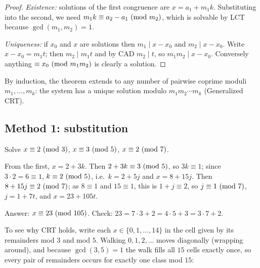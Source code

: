 \begin{proof}
\emph{Existence:} solutions of the first congruence are $x = a_1 + m_1k$. Substituting into the
second, we need $m_1 k \equiv a_2 - a_1 \ (\mathrm{mod}\ m_2)$, which is solvable by LCT because
$\gcd(m_1,m_2) = 1$.

\emph{Uniqueness:} if $x_0$ and $x$ are solutions then $m_1 \mid x - x_0$ and $m_2 \mid x - x_0$.
Write $x - x_0 = m_1 t$; then $m_2 \mid m_1 t$ and by CAD $m_2 \mid t$, so $m_1m_2 \mid x - x_0$.
Conversely anything $\equiv x_0 \ (\mathrm{mod}\ m_1m_2)$ is clearly a solution.
\end{proof}

By induction, the theorem extends to any number of pairwise coprime moduli
$m_1,\dots,m_k$: the system has a unique solution modulo $m_1m_2\cdots m_k$ (Generalized CRT).

\subsection{Method 1: substitution}

\begin{example}
Solve $x\equiv 2 \ (\mathrm{mod}\ 3)$, $x \equiv 3 \ (\mathrm{mod}\ 5)$, $x \equiv 2\ (\mathrm{mod}\ 7)$.

From the first, $x = 2 + 3k$. Then $2 + 3k \equiv 3 \ (\mathrm{mod}\ 5)$, so $3k \equiv 1$; since
$3\cdot 2 = 6 \equiv 1$, $k \equiv 2 \ (\mathrm{mod}\ 5)$, i.e.\ $k = 2 + 5j$ and $x = 8 + 15j$.
Then $8 + 15j \equiv 2 \ (\mathrm{mod}\ 7)$; as $8 \equiv 1$ and $15 \equiv 1$, this is $1 + j \equiv 2$, so
$j \equiv 1 \ (\mathrm{mod}\ 7)$, $j = 1 + 7t$, and $x = 23 + 105t$.

Answer: $x \equiv 23 \ (\mathrm{mod}\ 105)$. Check: $23 = 7\cdot 3 + 2 = 4\cdot 5 + 3 = 3\cdot 7 + 2$.
\end{example}

To see why CRT holds, write each $x \in \{0, 1, \dots, 14\}$ in the cell given by its
remainders mod $3$ and mod $5$. Walking $0, 1, 2, \dots$ moves diagonally (wrapping
around), and because $\gcd(3,5) = 1$ the walk fills all $15$ cells exactly once, so every pair
of remainders occurs for exactly one class mod $15$:
\begin{center}
\end{center}

